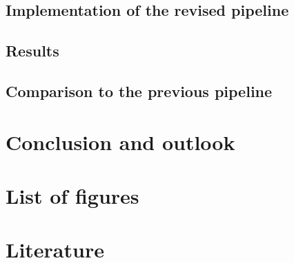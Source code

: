 \documentclass[12pt, oneside]{article}
\begin{document}
\subsection{Implementation of the revised pipeline}
\subsection{Results}
\subsection{Comparison to the previous pipeline}
\newpage
\section{Conclusion and outlook}
\newpage
\section{List of figures}
\newpage
\section{Literature}
\printbibliography
\end{document}
